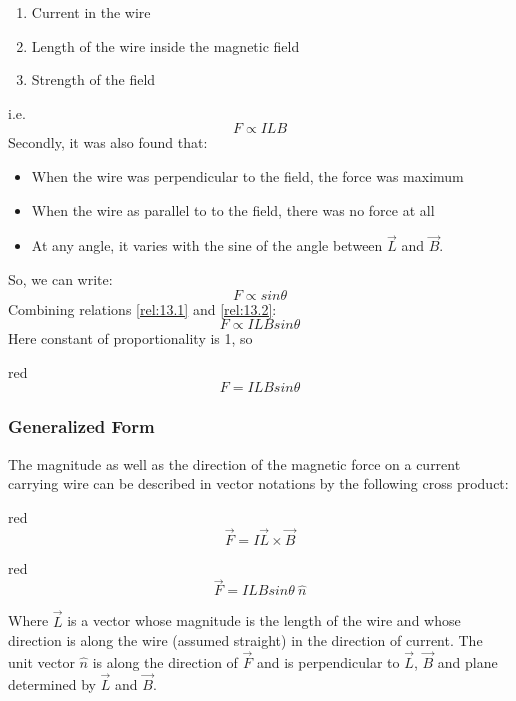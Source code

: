 \begin{enumerate}[label = (\roman*)]
    \item Current in the wire
    \item Length of the wire inside the magnetic field
    \item Strength of the field
\end{enumerate}
i.e.
\begin{equation}\label{rel:13.1}
 F \propto ILB 
\end{equation}
Secondly, it was also found that:
\begin{itemize}
\item When the wire was perpendicular to the field, the force was maximum
\item When the wire as parallel to to the field, there was no force at all
\item At any angle, it varies with the sine of the angle between $\vec{L}$
and $\vec{B}$.
\end{itemize}
\noindent So, we can write:
\begin{equation}\label{rel:13.2}
  F \propto sin\theta 
\end{equation}
Combining relations \ref{rel:13.1} and \ref{rel:13.2}:
\begin{equation}\nonumber
  F \propto ILB sin\theta 
\end{equation}
Here constant of proportionality is 1, so
\begin{mybox}{red}{}
\begin{equation}\label{eq:13.3}
  F = ILB sin\theta 
\end{equation}
\end{mybox}
\subsubsection{Generalized Form}
The magnitude as well as the direction of the magnetic force on a current carrying wire can be described in vector notations by the following cross product:
\begin{mybox}{red}{}
\begin{equation}\label{eq:13.4}
  \vec{F} = I \vec{L}\times \vec{B}
\end{equation}
\end{mybox}
\begin{mybox}{red}{}
\begin{equation}\label{eq:13.5}
\vec{F} = ILB sin\theta\:\hat{n} 
\end{equation}
\end{mybox}
Where $\vec{L}$ is a vector whose magnitude is the length of the wire
and whose direction is along the wire (assumed straight) in the
direction of current. The unit vector $\hat{n}$ is along the direction
of $\vec{F}$ and is perpendicular to $\vec{L}$, $\vec{B}$ and 
plane determined by $\vec{L}$ and $\vec{B}$.
